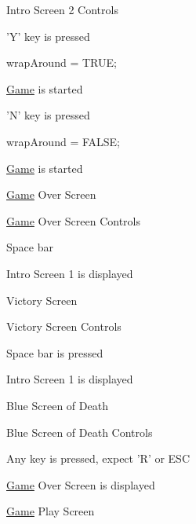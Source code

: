 \-Intro \-Screen 2 \-Controls
\begin{DoxyItemize}
\item '\-Y' key is pressed
\begin{DoxyItemize}
\item wrap\-Around = \-T\-R\-U\-E;
\item \hyperlink{classGame}{\-Game} is started
\end{DoxyItemize}
\item '\-N' key is pressed
\begin{DoxyItemize}
\item wrap\-Around = \-F\-A\-L\-S\-E;
\item \hyperlink{classGame}{\-Game} is started
\end{DoxyItemize}
\end{DoxyItemize}

\hyperlink{classGame}{\-Game} \-Over \-Screen 

\hyperlink{classGame}{\-Game} \-Over \-Screen \-Controls
\begin{DoxyItemize}
\item \-Space bar
\begin{DoxyItemize}
\item \-Intro \-Screen 1 is displayed
\end{DoxyItemize}
\end{DoxyItemize}

\-Victory \-Screen 

\-Victory \-Screen \-Controls
\begin{DoxyItemize}
\item \-Space bar is pressed
\begin{DoxyItemize}
\item \-Intro \-Screen 1 is displayed
\end{DoxyItemize}
\end{DoxyItemize}

\-Blue \-Screen of \-Death 

\-Blue \-Screen of \-Death \-Controls
\begin{DoxyItemize}
\item \-Any key is pressed, expect '\-R' or \-E\-S\-C
\begin{DoxyItemize}
\item \hyperlink{classGame}{\-Game} \-Over \-Screen is displayed
\end{DoxyItemize}
\end{DoxyItemize}

\hyperlink{classGame}{\-Game} \-Play \-Screen 

